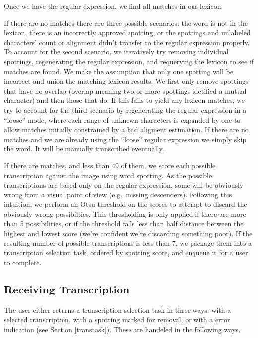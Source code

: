 \documentclass[ms,electronic,twosidetoc,letterpaper,chaptercenter,parttop,lol,lof,lot]{byumsphd}
\begin{document}
Once we have the regular expression, we find all matches in our lexicon.

If there are no matches there are three possible scenarios: the word is not in the lexicon, there is an incorrectly approved spotting, or the spottings and unlabeled characters' count or alignment didn't transfer to the regular expression properly.
To account for the second scenario, we iteratively try removing individual spottings, regenerating the regular expression, and requerying the lexicon to see if matches are found. We make the assumption that only one spotting will be incorrect and union the matching lexicon results. We first only remove spottings that have no overlap (overlap meaning two or more spottings idetified a mutual character) and then those that do.
If this fails to yield any lexicon matches, we try to account for the third scenario by regenerating the regular expression in a ``loose'' mode, where each range of unknown characters is expanded by one to allow matches initailly constrained by a bad aligment estimation.
If there are no matches and we are already using the ``loose'' regular expression we simply skip the word. It will be manually transcribed eventually.

If there are matches, and less than 49 of them, we score each possible transcription against the image using word spotting.
As the possible transcriptions are based only on the regular expression, some will be obviously wrong from a visual point of view (e.g.~missing descenders). Following this intuition, we perform an Otsu threshold on the scores to attempt to discard the obviously wrong possibilties. This thresholding is only applied if there are more than 5 possibilities, or if the threshold falls less than half distance between the highest and lowest score (we're confident we're discarding something poor).
If the resulting number of possible transcriptions is less than 7, we package them into a transcription selection task, ordered by spotting score, and enqueue it for a user to complete.


\subsection{Receiving Transcription}
The user either returns a transcription selection task in three ways: with a selected transcription, with a spotting marked for removal, or with a error indication (see Section \ref{transtask}). These are handeled in the following ways.
\end{document}
